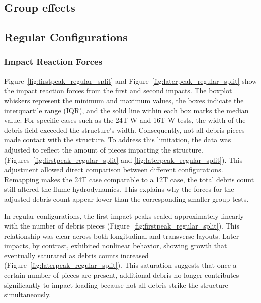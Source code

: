 \documentclass{article}
\begin{document}
{%

\subsection{Group effects}
\subsection{Regular Configurations}
\subsubsection{Impact Reaction Forces} 
Figure~\ref{fig:firstpeak_regular_split} and Figure~\ref{fig:laterpeak_regular_split} show the impact reaction forces from the first and second impacts. The boxplot whiskers represent the minimum and maximum values, the boxes indicate the interquartile range (IQR), and the solid line within each box marks the median value.
For specific cases such as the 24T-W and 16T-W tests, the width of the debris field exceeded the structure’s width. Consequently, not all debris pieces made contact with the structure. To address this limitation, the data was adjusted to reflect the amount of pieces impacting the structure.  (Figures~\ref{fig:firstpeak_regular_split} and \ref{fig:laterpeak_regular_split}). This adjustment allowed direct comparison between different configurations. Remapping makes the 24T case comparable to a 12T case, the total debris count still altered the flume hydrodynamics. This explains why the forces for the adjusted debris count appear lower than the corresponding smaller-group tests. 

In regular configurations, the first impact peaks scaled approximately linearly with the number of debris pieces (Figure~\ref{fig:firstpeak_regular_split}). This relationship was clear across both longitudinal and transverse layouts. Later impacts, by contrast, exhibited nonlinear behavior, showing growth that eventually saturated as debris counts increased (Figure~\ref{fig:laterpeak_regular_split}). This saturation suggests that once a certain number of pieces are present, additional debris no longer contributes significantly to impact loading because not all debris strike the structure simultaneously.

}
\end{document}
